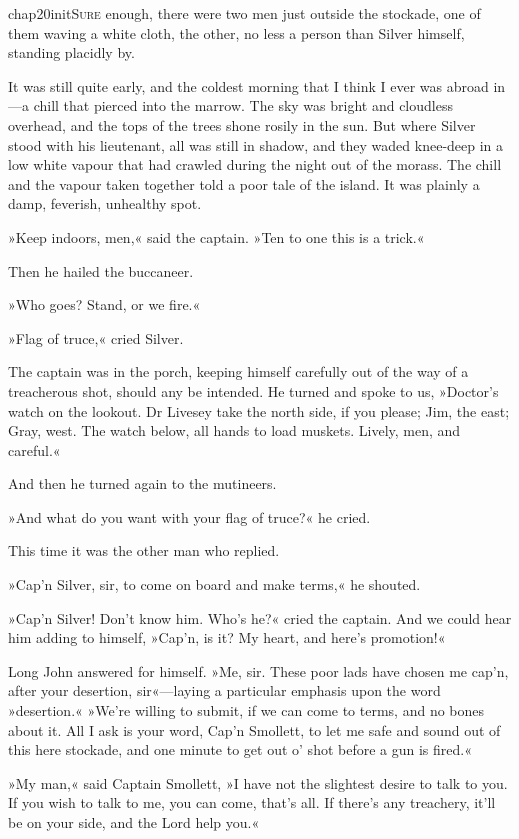 
   \lettrine[lines=4,image=true]{chap20initS}{ure} enough, there were two men just outside the stockade, one of them waving a white cloth, the other, no less a person than Silver himself, standing placidly by.

\zz
It was still quite early, and the coldest morning that I think I ever was abroad in—a chill that pierced into the marrow. The sky was bright and cloudless overhead, and the tops of the trees shone rosily in the sun. But where Silver stood with his lieutenant, all was still in shadow, and they waded knee-deep in a low white vapour that had crawled during the night out of the morass. The chill and the vapour taken together told a poor tale of the island. It was plainly a damp, feverish, unhealthy spot.

»Keep indoors, men,« said the captain. »Ten to one this is a trick.«

Then he hailed the buccaneer.

»Who goes? Stand, or we fire.«

»Flag of truce,« cried Silver.

The captain was in the porch, keeping himself carefully out of the way of a treacherous shot, should any be intended. He turned and spoke to us, »Doctor's watch on the lookout. Dr Livesey take the north side, if you please; Jim, the east; Gray, west. The watch below, all hands to load muskets. Lively, men, and careful.«

And then he turned again to the mutineers.

»And what do you want with your flag of truce?« he cried.

This time it was the other man who replied.

»Cap'n Silver, sir, to come on board and make terms,« he shouted.

»Cap'n Silver! Don't know him. Who's he?« cried the captain. And we could hear him adding to himself, »Cap'n, is it? My heart, and here's promotion!«

Long John answered for himself. »Me, sir. These poor lads have chosen me cap'n, after your desertion, sir«—laying a particular emphasis upon the word »desertion.« »We're willing to submit, if we can come to terms, and no bones about it. All I ask is your word, Cap'n Smollett, to let me safe and sound out of this here stockade, and one minute to get out o' shot before a gun is fired.«

»My man,« said Captain Smollett, »I have not the slightest desire to talk to you. If you wish to talk to me, you can come, that's all. If there's any treachery, it'll be on your side, and the Lord help you.«

